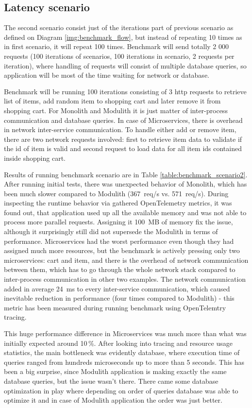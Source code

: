 \subsection{Latency scenario}
The second scenario consist just of the iterations part of previous scenario as defined on Diagram \ref{img:benchmark_flow}, but instead of repeating 10 times as in first scenario, it will repeat 100 times. Benchmark will send totally 2 000 requests (100 iterations of scenarios, 100 iterations in scenario, 2 requests per iteration), where handling of requests will consist of multiple database queries, so application will be most of the time waiting for network or database.

Benchmark will be running 100 iterations consisting of 3 http requests to retrieve list of items, add random item to shopping cart and later remove it from shopping cart. For Monolith and Modulith it is just matter of inter-process communication and database queries. In case of Microservices, there is overhead in network inter-service communication. To handle either add or remove item, there are two network requests involved: first to retrieve item data to validate if the id of item is valid and second request to load data for all item ids contained inside shopping cart.

Results of running benchmark scenario are in Table \ref{table:benchmark_scenario2}. After running initial tests, there was unexpected behavior of Monolith, which has been much slower compared to Modulith (367~req/s vs. 571~req/s). During inspecting the runtime behavior via gathered OpenTelemetry metrics, it was found out, that application used up all the available memory and was not able to process more parallel requests. Assigning it 100~MB of memory fix the issue, although it surprisingly still did not supersede the Modulith in terms of performance. Microservices had the worst performance even though they had assigned much more resources, but the benchmark is actively pressing only two microservices: cart and item, and there is the overhead of network communication between them, which has to go through the whole network stack compared to inter-process communication in other two examples. The network communication added in average 24~ms to every inter-service communication, which caused inevitable reduction in performance (four times compared to Modulith) - this metric has been measured during running benchmark using OpenTelemtry tracing.

This huge performance difference in Microservices was much more than what was initially expected around 10\,\%. After looking into tracing and resource usage statistics, the main bottleneck was evidently database, where execution time of queries ranged from hundreds microseconds up to more than 5 seconds. This has been a big surprise, since Modulith application is making exactly the same database queries, but the issue wasn't there. There came some database optimization in play where depending on order of queries database was able to optimize it and in case of Modulith application the order was just better.

